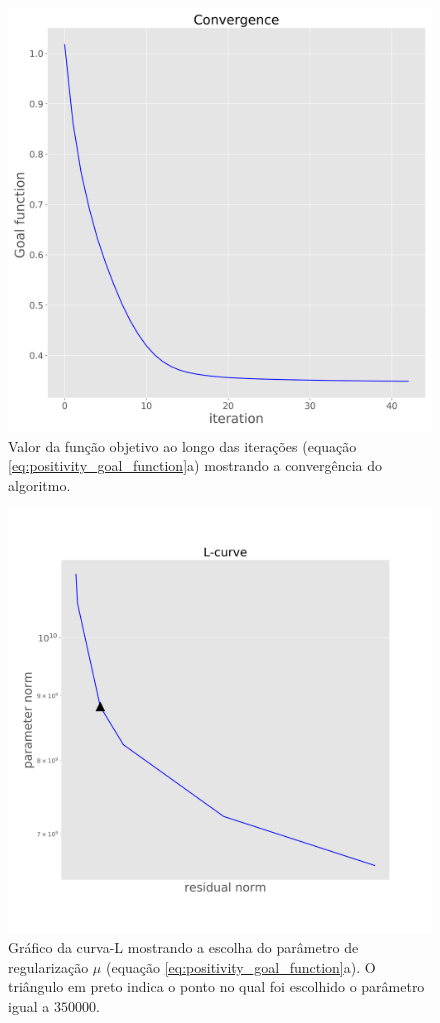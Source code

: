 \begin{figure}
	\centering
	\includegraphics[width=.9\textwidth]{Fig/eqlayer/unidir_test/convergence_LM_NNLS_magRM.png}
	\caption{Valor da função objetivo ao longo das iterações (equação \ref{eq:positivity_goal_function}a) mostrando a convergência do algoritmo.}
	\label{fig:convergence_1}
\end{figure}

\begin{figure}
	\centering
	\includegraphics[width=.9\textwidth]{Fig/eqlayer/unidir_test/Lcurve_RM.png}
	\caption{Gráfico da curva-L mostrando a escolha do parâmetro de regularização $\mu$ (equação \ref{eq:positivity_goal_function}a). O triângulo em preto indica o ponto no qual foi escolhido o parâmetro igual a $350000$.}
	\label{fig:lcurve_1}
\end{figure}


